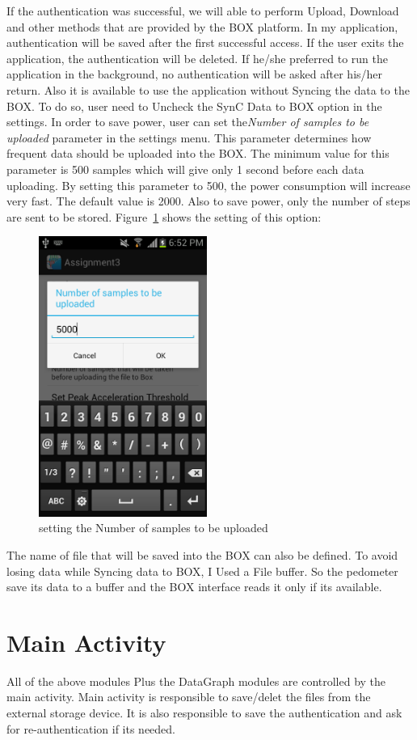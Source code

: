 \documentclass[conference]{IEEEtran}
\begin{document}
If the authentication was successful, we will able to perform Upload, Download and other methods that are provided by the BOX platform. In my application, authentication will be saved after the first successful access. If the user exits the application, the authentication will be deleted. If he/she preferred to run the application in the background, no authentication will be asked after his/her return. Also it is available to use the application without Syncing the data to the BOX. To do so, user need to Uncheck the SynC Data to BOX option in the settings. In order to save power, user can set the\emph{Number of samples to be uploaded } parameter in the settings menu. This parameter determines how frequent data should be uploaded into the BOX. The minimum value for this parameter is 500 samples which will give only 1 second before each data uploading. By setting this parameter to 500, the power consumption will increase very fast. The default value is 2000. Also to save power, only the number of steps are sent to be stored.
 Figure~\ref{NoSamples} shows the setting of this option:
\begin{figure}
\centering
\includegraphics[width=5.5cm]{NumbefOfSamples.png}
\caption{\scriptsize setting the Number of samples to be uploaded }
\label{NoSamples}
\end{figure}
The name of file that will be saved into the BOX can also be defined.
To avoid losing data while Syncing data to BOX, I Used a File buffer. So the pedometer save its data to a buffer and the BOX interface reads it only if its available.
\newpage
\section{Main Activity}
All of the above modules Plus the DataGraph modules are controlled by the main activity. Main activity is responsible to save/delet the files from the external storage device. It is also responsible to save the authentication and ask for re-authentication if its needed.
\end{document}
